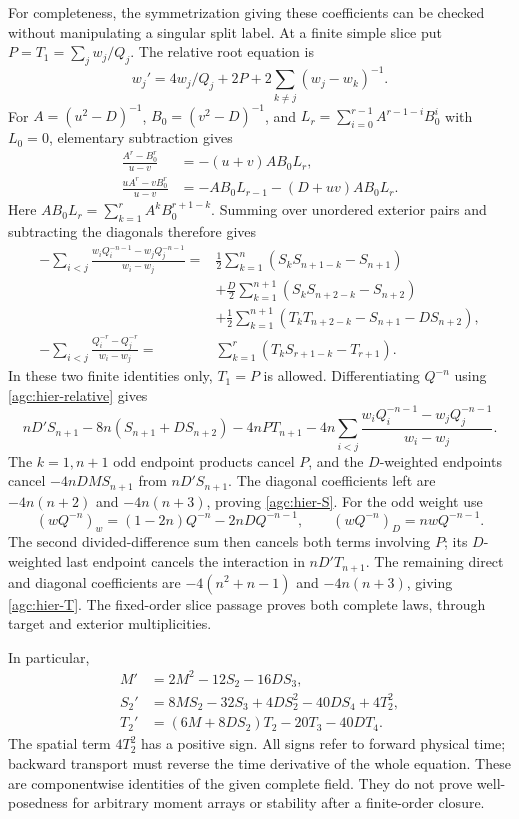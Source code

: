 For completeness, the symmetrization giving these coefficients can
be checked without manipulating a singular split label. At a finite
simple slice put $P=T_1=\sum_jw_j/Q_j$. The relative root equation is
\begin{equation}
 w_j'=4w_j/Q_j+2P+2\sum_{k\ne j}(w_j-w_k)^{-1}.
 \label{agc:hier-relative}
\end{equation}
For $A=(u^2-D)^{-1}$, $B_0=(v^2-D)^{-1}$, and
$L_r=\sum_{i=0}^{r-1}A^{r-1-i}B_0^i$ with $L_0=0$, elementary
subtraction gives
\begin{equation}
 \begin{split}
 \frac{A^r-B_0^r}{u-v}&=-(u+v)AB_0L_r,\\
 \frac{uA^r-vB_0^r}{u-v}
       &=-AB_0L_{r-1}-(D+uv)AB_0L_r.
 \end{split}
 \label{agc:hier-regular-DD}
\end{equation}
Here $AB_0L_r=\sum_{k=1}^r A^kB_0^{r+1-k}$. Summing over
unordered exterior pairs and subtracting the diagonals therefore gives
\begin{align*}
 -\sum_{i<j}\frac{w_iQ_i^{-n-1}-w_jQ_j^{-n-1}}{w_i-w_j}
 ={}&\frac12\sum_{k=1}^{n}(S_kS_{n+1-k}-S_{n+1})\\
 &+\frac D2\sum_{k=1}^{n+1}(S_kS_{n+2-k}-S_{n+2})\\
 &+\frac12\sum_{k=1}^{n+1}
                (T_kT_{n+2-k}-S_{n+1}-DS_{n+2}),\\
 -\sum_{i<j}\frac{Q_i^{-r}-Q_j^{-r}}{w_i-w_j}
 ={}&\sum_{k=1}^r(T_kS_{r+1-k}-T_{r+1}).
\end{align*}
In these two finite identities only, $T_1=P$ is allowed.
Differentiating $Q^{-n}$ using \eqref{agc:hier-relative} gives
\[
 nD'S_{n+1}-8n(S_{n+1}+DS_{n+2})-4nPT_{n+1}
       -4n\sum_{i<j}\frac{w_iQ_i^{-n-1}-w_jQ_j^{-n-1}}{w_i-w_j}.
\]
The $k=1,n+1$ odd endpoint products cancel $P$, and the
$D$-weighted endpoints cancel $-4nDMS_{n+1}$ from $nD'S_{n+1}$.
The diagonal coefficients left are $-4n(n+2)$ and $-4n(n+3)$,
proving \eqref{agc:hier-S}. For the odd weight use
\[
 (wQ^{-n})_w=(1-2n)Q^{-n}-2nDQ^{-n-1},\qquad
 (wQ^{-n})_D=nwQ^{-n-1}.
\]
The second divided-difference sum then cancels both terms involving
$P$; its $D$-weighted last endpoint cancels the interaction in
$nD'T_{n+1}$. The remaining direct and diagonal coefficients are
$-4(n^2+n-1)$ and $-4n(n+3)$, giving \eqref{agc:hier-T}.
The fixed-order slice passage proves both complete laws, through
target and exterior multiplicities.

In particular,
\begin{equation}
 \begin{split}
 M'&=2M^2-12S_2-16DS_3,\\
 S_2'&=8MS_2-32S_3+4DS_2^2-40DS_4+4T_2^2,\\
 T_2'&=(6M+8DS_2)T_2-20T_3-40DT_4.
 \end{split}
 \label{agc:hier-low}
\end{equation}
The spatial term $4T_2^2$ has a positive sign. All signs refer to
forward physical time; backward transport must reverse the time
derivative of the whole equation. These are componentwise identities
of the given complete field. They do not prove well-posedness for
arbitrary moment arrays or stability after a finite-order closure.

